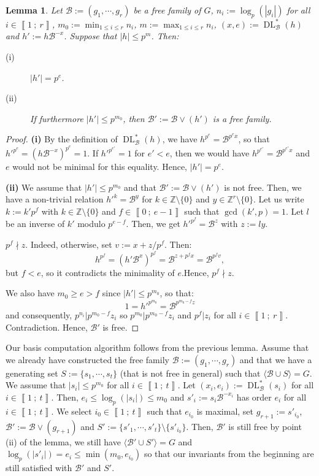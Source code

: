\documentclass[a4paper,10pt,notitlepage]{report}
\theoremstyle{definition}
\theoremstyle{plain}
\newtheorem{Lemma}[Definition]{Lemma}
\theoremstyle{definition}
\newcommand{\Z}{\mathbb{Z}}
\newcommand{\m}[1]{\mathcal{#1}}
\renewcommand{\i}[2]{\left\llbracket #1~;~#2\right\rrbracket}
\renewcommand{\(}{\left(}
\renewcommand{\)}{\right)}
\DeclareMathOperator{\DL}{DL}
\begin{document}
\begin{Lemma}
Let $\m{B}:=(g_1,\cdots, g_r)$ be a free family of $G$, $n_i:=\log_p(|g_i|)$ for all  $i\in\i{1}{r}$, $m_0:=\min_{1\leq i\leq r} n_i$, $m:=\max_{1\leq i\leq r} n_i$, $(x,e):=\DL_{\m{B}}^*(h)$ and $h':=h\m{B}^{-x}$. Suppose that $|h|\leq p^m$. Then:

\begin{description}
\item[(i)] $|h'|=p^e$.
\item[(ii)] If furthermore $|h'|\leq p^{m_0}$, then $\m{B}':=\m{B}\vee (h')$ is a free family.
\end{description}
\end{Lemma}

\begin{proof}
\textbf{(i)} By the definition of $\DL_{\m{B}}^*(h)$, we have $h^{p^e}=\m{B}^{p^ex}$, so that ${h'}^{p^e}=(h\m{B}^{-x})^{p^e}=1$. If ${h'}^{p^{e'}}=1$ for $e'<e$, then we would have $h^{p^{e'}}=\m{B}^{p^{e'} x}$ and $e$ would not be minimal for this equality. Hence, $|h'|=p^e$.

\textbf{(ii)} We assume that $|h'|\leq p^{m_0}$ and that $\m{B}':=\m{B}\vee (h')$ is not free. Then, we have a non-trivial relation ${h'}^k=\m{B}^y$ for $k\in\Z\setminus\{0\}$ and $y\in\Z^r\setminus\{0\}$. Let us write $k:=k'p^f$ with $k\in\Z\setminus\{0\}$ and $f\in\i{0}{e-1}$ such that $\gcd(k',p)=1$. Let $l$ be an inverse of $k'$ modulo $p^{e-f}$. Then, we get $h'^{p^f}=\m{B}^{z}$ with $z:=ly$. 

$p^f\nmid z$. Indeed, otherwise, set $v:=x+z/p^f$. Then:
\[h^{p^f}=(h'\m{B}^x)^{p^f}=\m{B}^{z+p^fx}=\m{B}^{p^f v},\]
but $f<e$, so it contradicts the minimality of $e$.Hence, $p^f\nmid z$.

We also have $m_0\geq e>f$ since $|h'|\leq p^{m_0}$, so that: 
\[1={h'}^{p^{m_0}}=\m{B}^{p^{m_0-f}z}\]
and consequently, $p^{n_i}|p^{m_0-f}z_i$ so $p^{m_0}|p^{m_0-f}z_i$ and $p^f| z_i$ for all $i\in\i{1}{r}$. Contradiction. Hence, $\m{B}'$ is free.
\end{proof}

Our basis computation algorithm follows from the previous lemma. Assume that we already have constructed the free family $\m{B}:=(g_1,\cdots, g_r)$ and that we have a generating set $S:=\{s_1,\cdots, s_t\}$ (that is not free in general) such that $\langle\m{B}\cup S\rangle=G$.  We assume that $|s_i|\leq p^{m_0}$ for all $i\in\i{1}{t}$. Let $(x_i,e_i):=\DL_{\m{B}}^*(s_i)$ for all $i\in\i{1}{t}$. Then, $e_i\leq \log_p(|s_i|)\leq m_0$ and $s'_i:=s_i\m{B}^{-x_i}$ has order $e_i$ for all $i\in\i{1}{t}$. We select $i_0\in\i{1}{t}$ such that $e_{i_0}$ is maximal, set $g_{r+1}:=s'_{i_0}$, $\m{B}':=\m{B}\vee(g_{r+1})$ and $S':=\{s'_1,\cdots, s'_t\}\setminus\{s'_{i_0}\}$. Then, $\m{B}'$ is still free by point (ii) of the lemma, we still have $\langle\m{B}'\cup S'\rangle=G$ and $\log_p(|s'_i|)=e_i\leq\min(m_0,e_{i_0})$ so that our invariants from the beginning are still satisfied with $\m{B}'$ and $S'$. 
\end{document}
